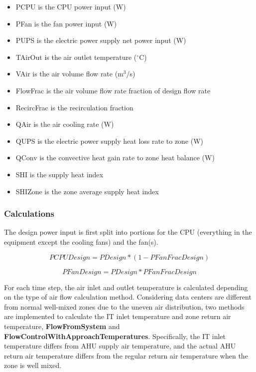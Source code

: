 \begin{itemize}
\tightlist
\item
  PCPU is the CPU power input (W)
\item
  PFan is the fan power input (W)
\item
  PUPS is the electric power supply net power input (W)
\item
  TAirOut is the air outlet temperature (\(^{\circ}\)C)
\item
  VAir is the air volume flow rate (m\(^3\)/s)
\item
  FlowFrac is the air volume flow rate fraction of design flow rate
\item
  RecircFrac is the recirculation fraction
\item
  QAir is the air cooling rate (W)
\item
  QUPS is the electric power supply heat loss rate to zone (W)
\item
  QConv is the convective heat gain rate to zone heat balance (W)
\item
  SHI is the supply heat index
\item
  SHIZone is the zone average supply heat index
\end{itemize}

\subsubsection{Calculations}\label{calculations}

The design power input is first split into portions for the CPU (everything in the equipment except the cooling fans) and the fan(s).

\begin{equation}
PCPUDesign = PDesign * (1 - PFanFracDesign)
\end{equation}

\begin{equation}
PFanDesign = PDesign * PFanFracDesign
\end{equation}

For each time step,  the air inlet and outlet temperature is calculated depending on the type of air flow calculation method. Considering data centers are different from normal well-mixed zones due to the uneven air distribution, two methods are implemented to calculate the IT inlet temperature and zone return air temperature, \textbf{FlowFromSystem} and \textbf{FlowControlWithApproachTemperatures}. Specifically, the IT inlet temperature differs from AHU supply air temperature, and the actual AHU return air temperature differs from the regular return air temperature when the zone is well mixed.

